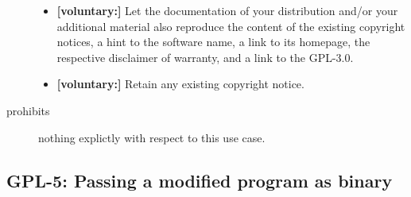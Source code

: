 \begin{description}
\begin{itemize}
  \item \textbf{[voluntary:]} Let the documentation of your distribution and/or
  your additional material also reproduce the content of the existing
  copyright notices, a hint to the software name, a link to its homepage,
  the respective disclaimer of warranty, and a link to the GPL-3.0.
  
  \item \textbf{[voluntary:]} Retain any existing copyright notice.  
  
 \end{itemize}
 
\item[prohibits] nothing explictly with respect to this use case.

\end{description}

\subsection{GPL-5: Passing a modified program as binary}

